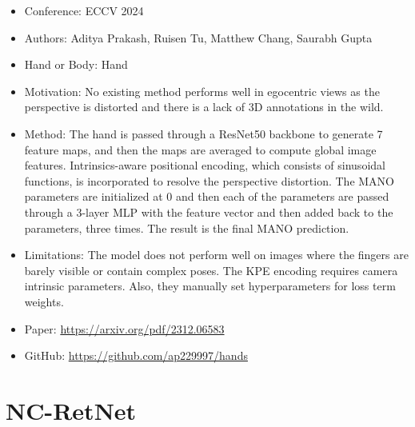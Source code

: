 \documentclass{article}
\begin{document}
\begin{itemize}
    \item Conference: ECCV 2024
    \item Authors: Aditya Prakash, Ruisen Tu, Matthew Chang, Saurabh Gupta
    \item Hand or Body: Hand
    \item Motivation: No existing method performs well in egocentric views as the perspective is distorted and there is a lack of 3D annotations in the wild.
    \item Method: The hand is passed through a ResNet50 backbone to generate 7 feature maps, and then the maps are averaged to compute global image features. Intrinsics-aware positional encoding, which consists of sinusoidal functions, is incorporated to resolve the perspective distortion. The MANO parameters are initialized at 0 and then each of the parameters are passed through a 3-layer MLP with the feature vector and then added back to the parameters, three times. The result is the final MANO prediction.
    \item Limitations: The model does not perform well on images where the fingers are barely visible or contain complex poses. The KPE encoding requires camera intrinsic parameters. Also, they manually set hyperparameters for loss term weights.
    \item Paper: \url{https://arxiv.org/pdf/2312.06583}
    \item GitHub: \url{https://github.com/ap229997/hands}
\end{itemize}

\pagebreak

\section*{NC-RetNet}
\end{document}
